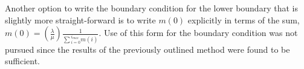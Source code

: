\documentclass[review]{elsarticle}
\begin{document}
Another option to write the boundary condition for the lower boundary that is slightly more straight-forward is to write $m(0)$ explicitly in terms of the sum, $m(0)=\left(\frac{\lambda}{\mu}\right)\frac{1}{\sum{}_{i=0}^{i_{max}}m(i)}$.
Use of this form for the boundary condition was not pursued since the results of the previously outlined method were found to be sufficient.







\end{document}
